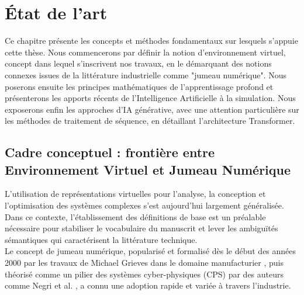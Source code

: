 \chapter{État de l'art}
\label{chap:SOTA}
Ce chapitre présente les concepts et méthodes fondamentaux sur lesquels s'appuie cette thèse. Nous commencerons par définir la notion d'environnement virtuel, concept dans lequel s'inscrivent nos travaux, en le démarquant des notions connexes issues de la littérature industrielle comme "jumeau numérique". Nous poserons ensuite les principes mathématiques de l'apprentissage profond et présenterons les apports récents de l'Intelligence Artificielle à la simulation. Nous exposerons enfin les approches d'IA générative, avec une attention particulière sur les méthodes de traitement de séquence, en détaillant l'architecture Transformer. 

\section{Cadre conceptuel : frontière entre Environnement Virtuel et Jumeau Numérique}
L'utilisation de représentations virtuelles pour l'analyse, la conception et l'optimisation des systèmes complexes s'est aujourd'hui largement généralisée. Dans ce contexte, l'établissement des définitions de base est un préalable nécessaire pour stabiliser le vocabulaire du manuscrit et lever les ambiguïtés sémantiques qui caractérisent la littérature technique. \\

Le concept de jumeau numérique, popularisé et formalisé dès le début des années 2000 par les travaux de Michael Grieves dans le domaine manufacturier \cite{grieves_digital_2014}, puis théorisé comme un pilier des systèmes cyber-physiques (CPS) par des auteurs comme Negri et al. \cite{negri_review_2017}, a connu une adoption rapide et variée à travers l'industrie.

